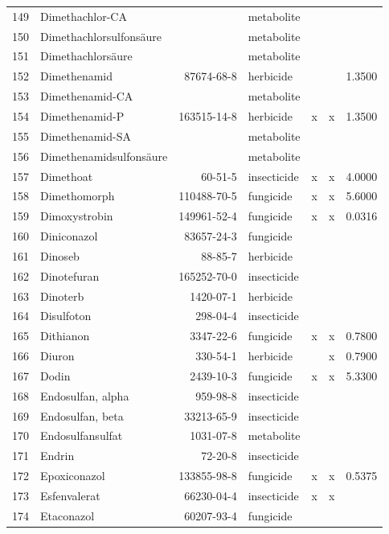 \begin{longtable}{lp{4cm}rlp{1.3cm}p{1.3cm}p{1.5cm}}
  149 & Dimethachlor-CA &  & metabolite &  &  &  \\ 
  150 & Dimethachlorsulfonsäure &  & metabolite &  &  &  \\ 
  151 & Dimethachlorsäure &  & metabolite &  &  &  \\ 
  152 & Dimethenamid & 87674-68-8 & herbicide &  &  & 1.3500 \\ 
  153 & Dimethenamid-CA &  & metabolite &  &  &  \\ 
  154 & Dimethenamid-P & 163515-14-8 & herbicide & x & x & 1.3500 \\ 
  155 & Dimethenamid-SA &  & metabolite &  &  &  \\ 
  156 & Dimethenamidsulfonsäure &  & metabolite &  &  &  \\ 
  157 & Dimethoat & 60-51-5 & insecticide & x & x & 4.0000 \\ 
  158 & Dimethomorph & 110488-70-5 & fungicide & x & x & 5.6000 \\ 
  159 & Dimoxystrobin & 149961-52-4 & fungicide & x & x & 0.0316 \\ 
  160 & Diniconazol & 83657-24-3 & fungicide &  &  &  \\ 
  161 & Dinoseb & 88-85-7 & herbicide &  &  &  \\ 
  162 & Dinotefuran & 165252-70-0 & insecticide &  &  &  \\ 
  163 & Dinoterb & 1420-07-1 & herbicide &  &  &  \\ 
  164 & Disulfoton & 298-04-4 & insecticide &  &  &  \\ 
  165 & Dithianon & 3347-22-6 & fungicide & x & x & 0.7800 \\ 
  166 & Diuron & 330-54-1 & herbicide &  & x & 0.7900 \\ 
  167 & Dodin & 2439-10-3 & fungicide & x & x & 5.3300 \\ 
  168 & Endosulfan, alpha & 959-98-8 & insecticide &  &  &  \\ 
  169 & Endosulfan, beta & 33213-65-9 & insecticide &  &  &  \\ 
  170 & Endosulfansulfat & 1031-07-8 & metabolite &  &  &  \\ 
  171 & Endrin & 72-20-8 & insecticide &  &  &  \\ 
  172 & Epoxiconazol & 133855-98-8 & fungicide & x & x & 0.5375 \\ 
  173 & Esfenvalerat & 66230-04-4 & insecticide & x & x &  \\ 
  174 & Etaconazol & 60207-93-4 & fungicide &  &  &  \\ 

\end{longtable}
